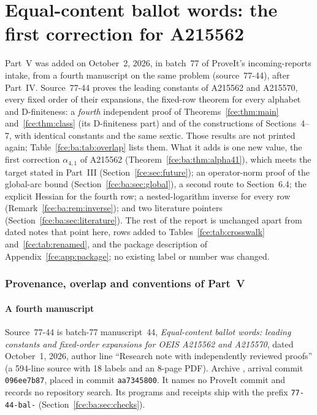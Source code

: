 \documentclass[11pt,a4paper]{article}
\numberwithin{equation}{section}
\theoremstyle{definition}\newtheorem{definition}[theorem]{Definition}
\theoremstyle{remark}\newtheorem{remark}[theorem]{Remark}
\begin{document}
\part{Equal-content ballot words: the first correction for A215562}\label{fce:ba:part}

Part~V was added on October~2, 2026, in batch~77 of ProveIt's
incoming-reports intake, from a fourth manuscript on the same problem
(source~77-44), after Part~IV. Source~77-44 proves the leading constants of
A215562 and A215570, every fixed order of their expansions, the fixed-row
theorem for every alphabet and D-finiteness: a \emph{fourth} independent
proof of Theorems~\ref{fce:thm:main} and~\ref{fce:thm:class} (its
D-finiteness part) and of the constructions of Sections~4--7, with
identical constants and the same sextic. Those results are not printed
again; Table~\ref{fce:ba:tab:overlap} lists them. What it adds is one new
value, the first correction $\alpha_{4,1}$ of A215562
(Theorem~\ref{fce:ba:thm:alpha41}), which meets the target stated in
Part~III (Section~\ref{fce:sec:future}); an operator-norm proof of the
global-arc bound (Section~\ref{fce:ba:sec:global}), a second route to
Section~6.4; the explicit Hessian for the fourth row; a nested-logarithm
inverse for every row (Remark~\ref{fce:ba:rem:inverse}); and two literature
pointers (Section~\ref{fce:ba:sec:literature}). The rest of the report is
unchanged apart from dated notes that point here, rows added to
Tables~\ref{fce:tab:crosswalk} and~\ref{fce:tab:renamed}, and the package
description of Appendix~\ref{fce:app:package}; no existing label or number
was changed.

\section{Provenance, overlap and conventions of Part~V}\label{fce:ba:sec:intro}
\subsection{A fourth manuscript}\label{fce:ba:sec:source}
Source~77-44 is batch-77 manuscript~44, \emph{Equal-content ballot words:
leading constants and fixed-order expansions for OEIS A215562 and A215570},
dated October~1, 2026, author line ``Research note with independently
reviewed proofs'' (a 594-line source with 18 labels and an 8-page PDF).
Archive , arrival commit
\texttt{096ee7b87}, placed in commit \texttt{aa7345800}. It names no ProveIt
commit and records no repository search. Its programs and receipts ship
with the prefix \texttt{77-44-bal-} (Section~\ref{fce:ba:sec:checks}).
\end{document}
